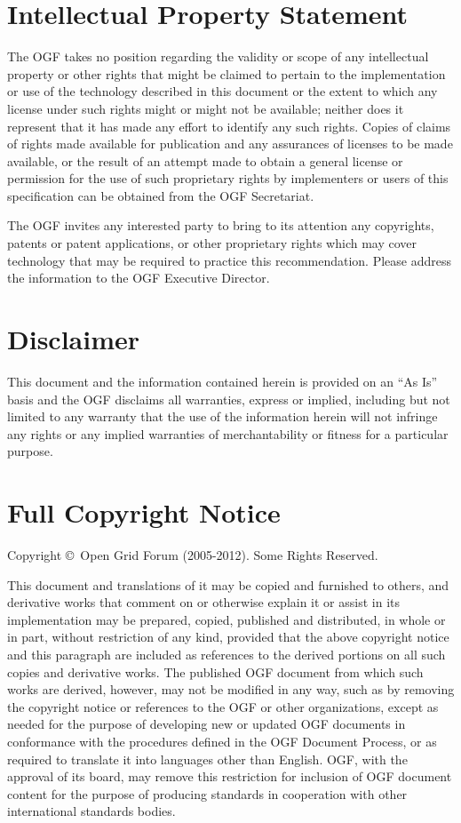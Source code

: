 \documentclass{article}
\newcommand{\copyrightyears}{2005-2012}
\begin{document}
\section{Intellectual Property Statement}

 The OGF takes no position regarding the validity or scope of any
 intellectual property or other rights that might be claimed to
 pertain to the implementation or use of the technology described in
 this document or the extent to which any license under such rights
 might or might not be available; neither does it represent that it
 has made any effort to identify any such rights.  Copies of claims of
 rights made available for publication and any assurances of licenses
 to be made available, or the result of an attempt made to obtain a
 general license or permission for the use of such proprietary rights
 by implementers or users of this specification can be obtained from
 the OGF Secretariat.

 The OGF invites any interested party to bring to its attention any
 copyrights, patents or patent applications, or other proprietary
 rights which may cover technology that may be required to practice
 this recommendation.  Please address the information to the OGF
 Executive Director.


\section{Disclaimer}

 This document and the information contained herein is provided on an
 ``As Is'' basis and the OGF disclaims all warranties, express or
 implied, including but not limited to any warranty that the use of
 the information herein will not infringe any rights or any implied
 warranties of merchantability or fitness for a particular purpose.


\section{Full Copyright Notice}

 Copyright \copyright \ Open Grid Forum (\copyrightyears). Some Rights
 Reserved.

 This document and translations of it may be copied and furnished to
 others, and derivative works that comment on or otherwise explain it
 or assist in its implementation may be prepared, copied, published
 and distributed, in whole or in part, without restriction of any
 kind, provided that the above copyright notice and this paragraph are
 included as references to the derived portions on all such copies and
 derivative works. The published OGF document from which such works
 are derived, however, may not be modified in any way, such as by
 removing the copyright notice or references to the OGF or other
 organizations, except as needed for the purpose of developing new or
 updated OGF documents in conformance with the procedures defined in
 the OGF Document Process, or as required to translate it into
 languages other than English. OGF, with the approval of its board,
 may remove this restriction for inclusion of OGF document content for
 the purpose of producing standards in cooperation with other
 international standards bodies. 
\end{document}
